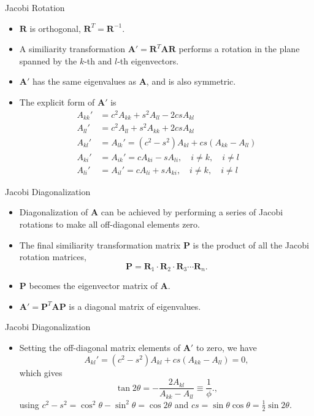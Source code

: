 \documentclass{beamer}
\begin{document}
\begin{frame}{Jacobi Rotation}
    \begin{itemize}
        \item $\mathbf{R}$ is orthogonal, $\mathbf{R}^T= \mathbf{R}^{-1}$.
        \item A similiarity transformation $\mathbf{A}'=\mathbf{R}^T \mathbf{A} \mathbf{R}$ performs 
        a rotation in the plane spanned by the $k$-th and $l$-th eigenvectors.
        \item $\mathbf{A}'$ has the same eigenvalues as $\mathbf{A}$, and is also symmetric. 
        \item The explicit form of $\mathbf{A}'$ is
        \begin{align*}
            A_{k k}' & =c^2 A_{k k}+s^2 A_{l l}-2 c s A_{k l} \\
            A_{l l}' & =c^2 A_{l l}+s^2 A_{k k}+2 c s A_{k l} \\
            A_{k l}' & =A_{l k}'=\left(c^2-s^2\right) A_{k l}+c s\left(A_{k k}-A_{l l}\right) \\
            A_{k i}' & =A_{i k}'=c A_{k i}-s A_{l i}, \quad i \neq k, \quad i \neq l \\
            A_{l i}' & =A_{i l}'=c A_{l i}+s A_{k i}, \quad i \neq k, \quad i \neq l
        \end{align*}

    \end{itemize}
\end{frame}
\begin{frame}{Jacobi Diagonalization}
    \begin{itemize}
        \item Diagonalization of $\mathbf{A}$ can be achieved by performing a series of Jacobi 
        rotations to make all off-diagonal elements zero.
        \item The final similiarity transformation matrix $\mathbf{P}$ is the product of 
        all the Jacobi rotation matrices,
        \[
        \mathbf{P}=\mathbf{R}_1 \cdot \mathbf{R}_2 \cdot \mathbf{R}_3 \cdots \mathbf{R}_n.
        \]
        \item $\mathbf{P}$ becomes the eigenvector matrix of $\mathbf{A}$.
        \item $\mathbf{A}'=\mathbf{P}^T \mathbf{A} \mathbf{P}$ is a diagonal matrix of eigenvalues.
    \end{itemize}
\end{frame}
\begin{frame}{Jacobi Diagonalization}
\begin{itemize}
    \item Setting the off-diagonal matrix elements of $\mathbf{A}'$ to zero, we have
    \[  
    A_{k l}'=\left(c^2-s^2\right) A_{k l}+c s\left(A_{k k}-A_{l l}\right)=0,
    \]
    which gives
    \[
    \tan 2 \theta=-\frac{2 A_{k l}}{A_{k k}-A_{l l}}\equiv \frac{1}{\phi}.,
    \]
    using $c^2-s^2=\cos ^2 \theta-\sin ^2 \theta=\cos 2 \theta$ and $c s=\sin \theta \cos \theta=\frac{1}{2} \sin 2 \theta$.
\end{itemize}
\end{frame}
\end{document}
